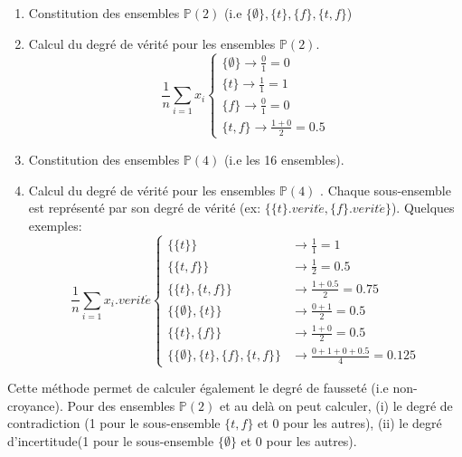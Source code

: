 \begin{refsegment}
\begin{enumerate}
    \item Constitution des ensembles $\mathbb{P}(2)$ (i.e $\{\emptyset\},\{t\},\{f\},\{t,f\}$)
    \item Calcul du degré de vérité pour les ensembles  $\mathbb{P}(2)$.
    \begin{equation*}
    \frac{1}{n} \sum_{i=1}x_{i}
    \begin{cases}
    \{\emptyset\} \to \frac{0}{1} = 0 \\
    \{t\} \to \frac{1}{1} = 1 \\
    \{f\} \to \frac{0}{1} = 0 \\
    \{t,f\} \to \frac{1+0}{2} = 0.5
    \end{cases}
    \end{equation*}
    \item Constitution des ensembles $\mathbb{P}(4)$ (i.e les 16 ensembles).
    \item Calcul du degré de vérité pour les ensembles  $\mathbb{P}(4)$ . Chaque sous-ensemble est représenté par son degré de vérité (ex: $\{\{t\}.verit\acute{e},\{f\}.verit\acute{e}\}$). Quelques exemples:
    \begin{equation*}
    \frac{1}{n} \sum_{i=1}x_{i}.verit\acute{e}
    \begin{cases}
    \{\{t\}\}                               &\to \frac{1}{1} = 1 \\
    \{\{t,f\}\}                             &\to \frac{1}{2} = 0.5 \\
    \{\{t\},\{t,f\}\}                       &\to \frac{1+0.5}{2} = 0.75 \\
    \{\{\emptyset\},\{t\}\}                 &\to \frac{0+1}{2} = 0.5 \\
    \{\{t\},\{f\}\}                         &\to \frac{1+0}{2} = 0.5 \\
    \{\{\emptyset\},\{t\},\{f\},\{t,f\}\}   &\to \frac{0+1+0+0.5}{4} = 0.125
    \end{cases}
    \end{equation*}
\end{enumerate}

Cette méthode permet de calculer également le degré de fausseté (i.e non-croyance). Pour des ensembles  $\mathbb{P}(2)$ et au delà on peut calculer, (i) le degré de contradiction (1 pour le sous-ensemble $\{t,f\}$ et 0 pour les autres), (ii) le degré d'incertitude(1 pour le sous-ensemble $\{\emptyset\}$ et 0 pour les autres).


\end{refsegment}
